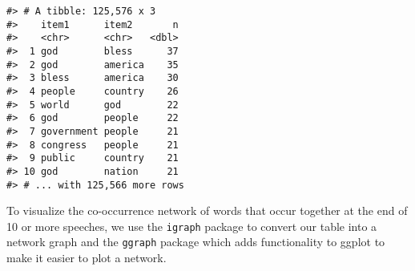 \documentclass[]{book}
\newenvironment{Shaded}{\begin{snugshade}}{\end{snugshade}}
\newcommand{\CommentTok}[1]{\textcolor[rgb]{0.56,0.35,0.01}{\textit{#1}}}
\newcommand{\DataTypeTok}[1]{\textcolor[rgb]{0.13,0.29,0.53}{#1}}
\newcommand{\DecValTok}[1]{\textcolor[rgb]{0.00,0.00,0.81}{#1}}
\newcommand{\FloatTok}[1]{\textcolor[rgb]{0.00,0.00,0.81}{#1}}
\newcommand{\KeywordTok}[1]{\textcolor[rgb]{0.13,0.29,0.53}{\textbf{#1}}}
\newcommand{\NormalTok}[1]{#1}
\newcommand{\OperatorTok}[1]{\textcolor[rgb]{0.81,0.36,0.00}{\textbf{#1}}}
\newcommand{\OtherTok}[1]{\textcolor[rgb]{0.56,0.35,0.01}{#1}}
\newcommand{\StringTok}[1]{\textcolor[rgb]{0.31,0.60,0.02}{#1}}
\begin{document}
\begin{verbatim}
#> # A tibble: 125,576 x 3
#>    item1      item2       n
#>    <chr>      <chr>   <dbl>
#>  1 god        bless      37
#>  2 god        america    35
#>  3 bless      america    30
#>  4 people     country    26
#>  5 world      god        22
#>  6 god        people     22
#>  7 government people     21
#>  8 congress   people     21
#>  9 public     country    21
#> 10 god        nation     21
#> # ... with 125,566 more rows
\end{verbatim}

To visualize the co-occurrence network of words that occur together at the end of 10 or more speeches, we use the \texttt{igraph} package to convert our table into a network graph and the \texttt{ggraph} package which adds functionality to ggplot to make it easier to plot a network.

\begin{Shaded}
\end{Shaded}
\end{document}
